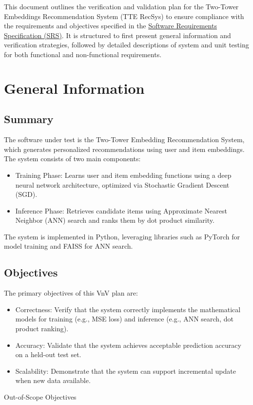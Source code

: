 \documentclass[12pt, titlepage]{article}
\begin{document}
\newpage


This document outlines the verification and validation plan for the Two-Tower Embeddings Recommendation System (TTE RecSys) to ensure compliance with the requirements and objectives specified in the \href{https://github.com/V-AS/Two-tower-recommender-system/blob/main/docs/SRS/SRS.pdf}{Software Requirements Specification (SRS)}. It is structured to first present general information and verification strategies, followed by detailed descriptions of system and unit testing for both functional and non-functional requirements.

\section{General Information}

\subsection{Summary}

The software under test is the Two-Tower Embedding Recommendation System, which generates personalized recommendations using user and item embeddings. The system consists of two main components:
\begin{itemize}
  \item Training Phase: Learns user and item embedding functions using a deep neural network architecture, optimized via Stochastic Gradient Descent (SGD).
  \item Inference Phase: Retrieves candidate items using Approximate Nearest Neighbor (ANN) search and ranks them by dot product similarity.
\end{itemize}

The system is implemented in Python, leveraging libraries such as PyTorch for model training and FAISS for ANN search.

\subsection{Objectives}
The primary objectives of this VnV plan are:
\begin{itemize}
  \item Correctness: Verify that the system correctly implements the mathematical models for training (e.g., MSE loss) and inference (e.g., ANN search, dot product ranking).
  \item Accuracy: Validate that the system achieves acceptable prediction accuracy on a held-out test set.
  \item Scalability: Demonstrate that the system can support incremental update when new data available.
\end{itemize}
\noindent Out-of-Scope Objectives
\end{document}
